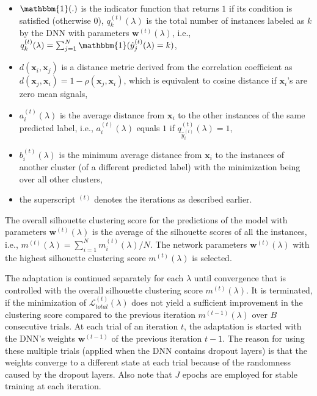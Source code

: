 \documentclass[12pt]{iopart}
\newcommand{\matr}[1]{\mathbf{#1}}
\begin{document}
\begin{itemize}
\item $\mathbbm{1}(.)$ is the indicator function that returns $1$ if its condition is satisfied (otherwise $0$), $q^{(t)}_k({\lambda})$ is the total number of instances labeled as $k$ by the DNN with parameters $\matr{w}^{(t)}({\lambda})$, i.e., $q^{(t)}_k({\lambda}) = \sum_{j=1}^{N} \mathbbm{1}(\hat{y}^{(t)}_{j}({\lambda})=k)$,

\item $d(\matr{x}_i,\matr{x}_j)$ is a distance metric derived from the correlation coefficient as $d(\matr{x}_j,\matr{x}_i)=1-\rho(\matr{x}_j,\matr{x}_i)$, which is equivalent to cosine distance if $\matr{x}_i$'s are zero mean signals,

\item $a^{(t)}_i({\lambda})$ is the average distance from $\matr{x}_i$ to the other instances of the same predicted label, i.e., $a^{(t)}_i({\lambda})$ equals $1$ if  $q^{(t)}_{\hat{y}_{i}^{(t)}}({\lambda})=1$,

\item $b^{(t)}_i({\lambda})$ is the minimum average distance from $\matr{x}_i$ to the instances of another cluster (of a different predicted label) with the minimization being over all other clusters,

\item the superscript $^{(t)}$ denotes the iterations as described earlier.
\end{itemize}
The overall silhouette clustering score for the predictions of the model with parameters $\matr{w}^{(t)}(\lambda)$ is the average of the silhouette scores of all the instances, i.e., $m^{(t)}(\lambda) = \sum_{i=1}^{N} m_i^{(t)}(\lambda) /N$. The network parameters $\matr{w}^{(t)}(\lambda)$ with the highest silhouette clustering score $m^{(t)}(\lambda)$ is selected. 



The adaptation is continued separately for each $\lambda$ until convergence that is controlled with the overall silhouette clustering score $m^{(t)}(\lambda)$. It is terminated, if the minimization of $\mathcal{L}_{{total}}^{(t)}(\lambda)$ does not yield a sufficient improvement in the clustering score compared to the previous iteration $m^{(t-1)}(\lambda)$ over $B$ consecutive trials. At each trial of an iteration $t$, the adaptation is started with the DNN's weights $\matr{w}^{(t-1)}$ of the previous iteration $t-1$. The reason for using these multiple trials (applied when the DNN contains dropout layers) is that the weights converge to a different state at each trial because of the randomness caused by the dropout layers. Also note that $J$ epochs are employed for stable training at each iteration. 
\end{document}
